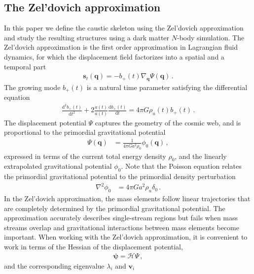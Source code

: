 \documentclass[a4paper, 11pt]{article}
\begin{document}
\subsection{The Zel'dovich approximation}\label{sec:Zeldovich}
In this paper we define the caustic skeleton using the Zel'dovich approximation and study the resulting structures using a dark matter $N$-body simulation. The Zel'dovich approximation is the first order approximation in Lagrangian fluid dynamics, for which the displacement field factorizes into a spatial and a temporal part
\begin{align}
\bm{s}_t(\bm{q}) = - b_+(t) \nabla_{\bm{q}} \Psi(\bm{q})\,.
\end{align}
The growing mode $b_+(t)$ is a natural time parameter satisfying the differential equation
\begin{align}
\frac{\mathrm{d}^2 b_+(t)}{\mathrm{d}t^2} + 2 \frac{\dot{a}(t)}{a(t)} \frac{\mathrm{d} b_+(t)}{\mathrm{d}t} = 4 \pi G \rho_u(t) b_+(t)\,.
\end{align}
The displacement potential $\Psi$ captures the geometry of the cosmic web, and is proportional to the primordial gravitational potential
\begin{align}
\Psi(\bm{q}) &=\frac{1}{4 \pi G a^2 \rho_0}\phi_0(\bm{q})%
\,,
\end{align}
expressed in terms of the current total energy density %
$\rho_0$,
and the linearly extrapolated gravitational potential $\phi_0$. Note that the Poisson equation relates the primordial gravitational potential to the primordial density perturbation
\begin{align}
\nabla ^2 \phi_0 &= 4 \pi G a^2 \rho_u \delta_0\,.%
\end{align}
In the Zel'dovich approximation, the mass elements follow linear trajectories that are completely determined by the primordial gravitational potential. The approximation accurately describes single-stream regions but fails when mass streams overlap and gravitational interactions between mass elements become important. When working with the Zel'dovich approximation, it is convenient to work in terms of the Hessian of the displacement potential,
\begin{align}
\bm{\psi}=\mathcal{H}\Psi\,,
\end{align}
and the corresponding eigenvalue $\lambda_i$ and $\bm{v}_i$
\end{document}
